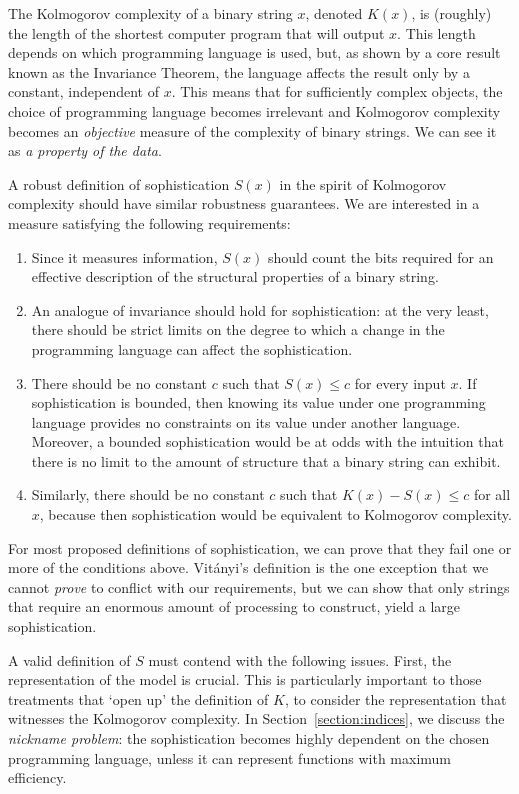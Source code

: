 \documentclass{style/llncs}
\begin{document}
The Kolmogorov complexity of a binary string $x$, denoted $K(x)$, is (roughly) the length of the shortest computer program that will output $x$. This length depends on which programming language is used, but, as shown by a core result known as the Invariance Theorem, the language affects the result only by a constant, independent of $x$. This means that for sufficiently complex objects, the choice of programming language becomes irrelevant and Kolmogorov complexity becomes an \emph{objective} measure of the complexity of binary strings. We can see it as \emph{a property of the data}.

A robust definition of sophistication $S(x)$ in the spirit of Kolmogorov complexity should have similar robustness guarantees. We are interested in a measure satisfying the following requirements:

\begin{enumerate}
\item Since it measures information, $S(x)$ should count the bits required for an effective description of the structural properties of a binary string.
\item An analogue of invariance should hold for sophistication: at the very least, there should be strict limits on the degree to which a change in the programming language can affect the sophistication.
\item There should be no constant $c$ such that $S(x)\le c$ for every input $x$. If sophistication is bounded, then knowing its value under one programming language provides no constraints on its value under another language. Moreover, a bounded sophistication would be at odds with the intuition that there is no limit to the amount of structure that a binary string can exhibit.
\item Similarly, there should be no constant $c$ such that $K(x)-S(x)\le c$ for all $x$, because then sophistication would be equivalent to Kolmogorov complexity. 
\end{enumerate}
For most proposed definitions of sophistication, we can prove that they fail one or more of the conditions above. Vit\'anyi's definition \cite{vitanyi2004meaningful} is the one exception that we cannot \emph{prove} to conflict with our requirements, but we can show that only strings that require an enormous amount of processing to construct, yield a large sophistication.

A valid definition of $S$ must contend with the following issues. First, the representation of the model is crucial. This is particularly important to those treatments that `open up' the definition of $K$, to consider the representation that witnesses the Kolmogorov complexity. In Section~\ref{section:indices}, we discuss the \emph{nickname problem}: the sophistication becomes highly dependent on the chosen programming language, unless it can represent functions with maximum efficiency. 
\end{document}
